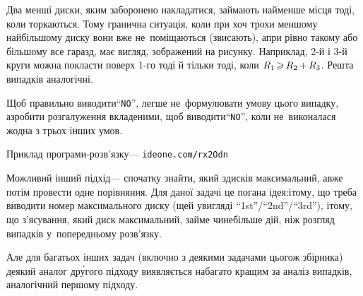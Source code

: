 \Tutorial
Два менші диски, яким заборонено накладатися, займають найменше місця тоді, коли торкаються. 
Тому гранична ситуація, коли при хоч трохи меншому найбільшому диску вони вже не~поміщаються (звисають), а\nolinebreak[3] при рівно такому або більшому все гаразд, має вигляд, зображений на рисунку. Наприклад, \mbox{2-й} і \mbox{3-й} круги можна покласти поверх \mbox{1-го} тоді й тільки тоді, коли $R_1\dib{{\>}}R_2\dib{{+}}R_3$. Решта випадків аналогічні.

Щоб правильно виводити\nolinebreak[3] ``\texttt{NO}'', легше не~формулювати умову цього випадку, а\nolinebreak[3] зробити розгалуження вкладеними, щоб виводити\nolinebreak[3] ``\texttt{NO}'', коли не~виконалася жодна з трьох інших умов.

Приклад програми-розв'язку\nolinebreak[3] --- \verb"ideone.com/rx2Odn"

Можливий інший підхід\nolinebreak[3] --- спочатку знайти, який з\nolinebreak[3] дисків максимальний, а\nolinebreak[3] вже потім провести одне порівняння. Для даної задачі це погана ідея:\linebreak[1] і\nolinebreak[3] тому, що треба виводити номер максимального диску (ще\nolinebreak[3] й у\nolinebreak[3] вигляді ``1st''/``2nd''/``3rd''), і\nolinebreak[3] тому, що з'ясування, який диск максимальний, займе чи\nolinebreak[3] не\nolinebreak[3] більше дій, ніж розгляд випадків у~попередньому розв'язку.

Але для багатьох інших задач (включно з деякими задачами цього\nolinebreak[3] ж збірника) \mbox{деякий} аналог др\'{у}гого підходу виявляється набагато кращим за аналіз випадків, аналогічний першому підходу.
